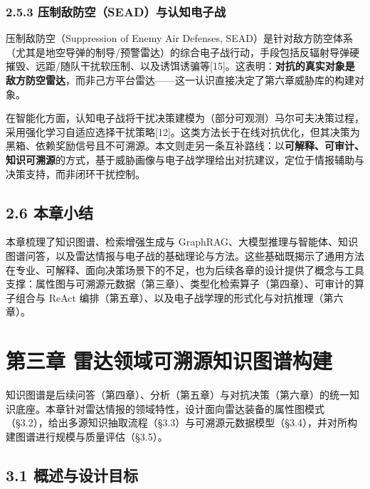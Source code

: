 \documentclass[12pt,a4paper]{ctexart}
\begin{document}
\subsubsection*{2.5.3 压制敌防空（SEAD）与认知电子战}

压制敌防空（Suppression of Enemy Air Defenses, SEAD）是针对敌方防空体系（尤其是地空导弹的制导/预警雷达）的综合电子战行动，手段包括反辐射导弹硬摧毁、远距/随队干扰软压制、以及诱饵诱骗等[15]。这表明：\textbf{对抗的真实对象是敌方防空雷达}，而非己方平台雷达——这一认识直接决定了第六章威胁库的构建对象。

在智能化方面，认知电子战将干扰决策建模为（部分可观测）马尔可夫决策过程，采用强化学习自适应选择干扰策略[12]。这类方法长于在线对抗优化，但其决策为黑箱、依赖奖励信号且不可溯源。本文则走另一条互补路线：以\textbf{可解释、可审计、知识可溯源}的方式，基于威胁画像与电子战学理给出对抗建议，定位于情报辅助与决策支持，而非闭环干扰控制。

\subsection*{2.6 本章小结}

本章梳理了知识图谱、检索增强生成与 GraphRAG、大模型推理与智能体、知识图谱问答，以及雷达情报与电子战的基础理论与方法。这些基础既揭示了通用方法在专业、可解释、面向决策场景下的不足，也为后续各章的设计提供了概念与工具支撑：属性图与可溯源元数据（第三章）、类型化检索算子（第四章）、可审计的算子组合与 ReAct 编排（第五章）、以及电子战学理的形式化与对抗推理（第六章）。



\section*{第三章 雷达领域可溯源知识图谱构建}

知识图谱是后续问答（第四章）、分析（第五章）与对抗决策（第六章）的统一知识底座。本章针对雷达情报的领域特性，设计面向雷达装备的属性图模式（§3.2），给出多源知识抽取流程（§3.3）与可溯源元数据模型（§3.4），并对所构建图谱进行规模与质量评估（§3.5）。

\subsection*{3.1 概述与设计目标}
\end{document}
